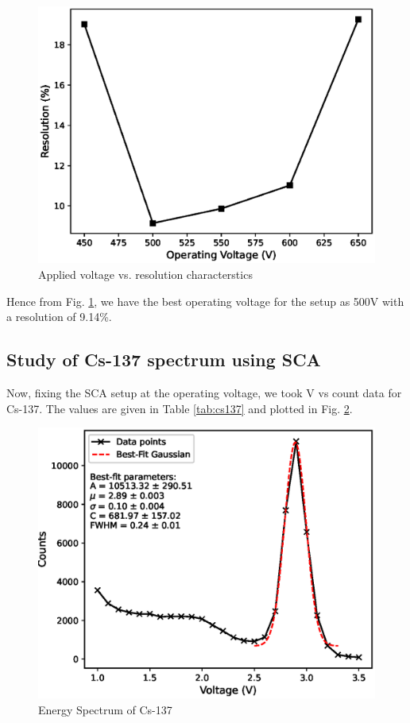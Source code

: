 \begin{figure}[H]
    \centering
    \includegraphics[width=1\columnwidth]{images/ov.eps}
    \caption{Applied voltage vs. resolution characterstics}
    \label{ov}
\end{figure}



Hence from Fig. \ref{ov}, we have the best operating voltage for the setup as 500V with a resolution of 9.14\%.

\subsection{Study of Cs-137 spectrum using SCA}

Now, fixing the SCA setup at the operating voltage, we took V vs count data for Cs-137. The values are given in Table \ref{tab:cs137} and plotted in Fig. \ref{cs137}.



\begin{figure}[H]
    \centering
    \includegraphics[width=1\columnwidth]{images/cs137.eps}
    \caption{Energy Spectrum of Cs-137}
    \label{cs137}
\end{figure}

